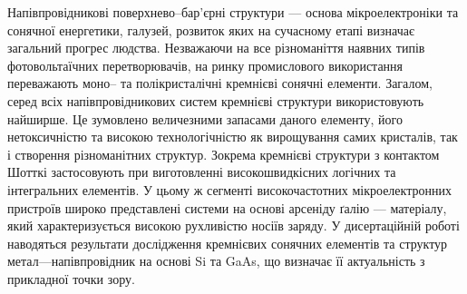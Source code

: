 %
%
%
%
%
%
%
%
%
%

{\actualityTXT}
Напівпровідникові поверхнево--бар'єрні структури --- основа мікроелектроніки та сонячної енергетики, галузей, розвиток яких на сучасному етапі визначає загальний прогрес людства.
Незважаючи на все різноманіття наявних типів фотовольтаїчних перетворювачів, на ринку промислового використання переважають моно-- та полікристалічні кремнієві сонячні елементи.
Загалом, серед всіх напівпровідникових систем кремнієві структури використовують найширше.
Це зумовлено величезними запасами даного елементу, його нетоксичністю та високою технологічністю як вирощування самих кристалів, так і створення різноманітних структур.
Зокрема кремнієві структури з контактом Шотткі  застосовують при виготовленні високошвидкісних логічних та інтегральних елементів.
У цьому ж сегменті високочастотних мікроелектронних пристроїв широко представлені системи на основі арсеніду ґалію --- матеріалу, який характеризується високою рухливістю носіїв заряду.
У дисертаційній роботі наводяться результати дослідження кремнієвих сонячних елементів та структур метал---напівпровідник на основі Si та GaAs, що визначає її актуальність з прикладної точки зору.

